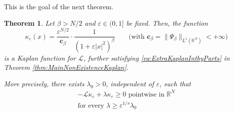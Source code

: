 \documentclass[11pt,a4paper,reqno]{amsart}
\def \R {\mathbb{R}}
\def \e {\varepsilon}
\def \LL {\mathcal{L}}
\theoremstyle{definition}
\theoremstyle{plain}
\newtheorem{theorem}[definition]{Theorem}
\numberwithin{equation}{section}
\begin{document}
This is the goal of the next theorem.
\begin{theorem} \label{thm:ExplicitKaplan}
Let $\beta > N/2$ and $\e\in(0,1]$ be fixed. Then, the function
$$\kappa_\e(x) = \frac{\e^{N/2}}{\mathbf{c}_\beta}\cdot\frac{1}{(1+\e|x|^2)^{\beta}}\qquad \big(\text{with $\mathbf{c}_\beta = \|\Psi_\beta\|_{L^1(\mathbb{R}^N)}<+\infty$}\big)$$
is a Kaplan function for $\LL$, further satisfying \eqref{eq:ExtraKaplanIntbyParts} in Theorem \ref{thm:MainNonExistenceKaplan}.

More precisely, there exists $\lambda_0  > 0$, independent of $\e$, such that
\begin{equation} \label{eq:Prop3strongerform}
\begin{gathered}
\text{$-\LL\kappa_\e+\lambda\kappa_\e\geq 0$ pointwise in $\R^N$}	 \\	
\text{for every $\lambda\geq \e^{1/s}\lambda_0$}
\end{gathered}	
\end{equation}
\end{theorem}
\end{document}
